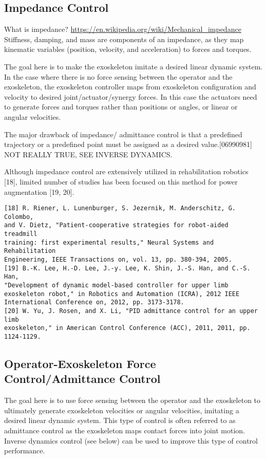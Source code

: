 \documentclass[letterpaper,12pt,fullpage]{article}
\begin{document}
\subsection{Impedance Control}

What is impedance?
\url{https://en.wikipedia.org/wiki/Mechanical_impedance}
Stiffness, damping, and mass are components of an impedance, as
they map kinematic variables (position, velocity, and acceleration)
to forces and torques.

The goal here is to make the exoskeleton imitate a desired linear dynamic system.
In the case where there is no force sensing between the operator and the
exoskeleton, the exoskeleton controller maps from exoskeleton configuration
and velocity to desired joint/actuator/synergy forces.
In this case the actuators need to generate forces and torques rather than
positions or angles, or linear or angular velocities.

The major drawback of impedance/ admittance control
is that a predefined trajectory or a predefined point must be
assigned as a desired value.[06990981] NOT REALLY TRUE, SEE INVERSE DYNAMICS.

Although impedance control are extensively utilized in rehabilitation
robotics [18], limited number of studies has been focused on
this method for power augmentation [19, 20].
\begin{verbatim}
[18] R. Riener, L. Lunenburger, S. Jezernik, M. Anderschitz, G. Colombo,
and V. Dietz, "Patient-cooperative strategies for robot-aided treadmill
training: first experimental results," Neural Systems and Rehabilitation
Engineering, IEEE Transactions on, vol. 13, pp. 380-394, 2005.
[19] B.-K. Lee, H.-D. Lee, J.-y. Lee, K. Shin, J.-S. Han, and C.-S. Han,
"Development of dynamic model-based controller for upper limb
exoskeleton robot," in Robotics and Automation (ICRA), 2012 IEEE
International Conference on, 2012, pp. 3173-3178.
[20] W. Yu, J. Rosen, and X. Li, "PID admittance control for an upper limb
exoskeleton," in American Control Conference (ACC), 2011, 2011, pp.
1124-1129.
\end{verbatim}

\subsection{Operator-Exoskeleton Force Control/Admittance Control}

The goal here is to use force sensing between the operator and the
exoskeleton to ultimately generate exoskeleton velocities or angular velocities,
imitating a desired linear dynamic system.
This type of control is often referred to as admittance control as the
exoskeleton maps contact forces into joint motion.
Inverse dynamics control (see below)
can be used to improve this type of control performance.
\end{document}
